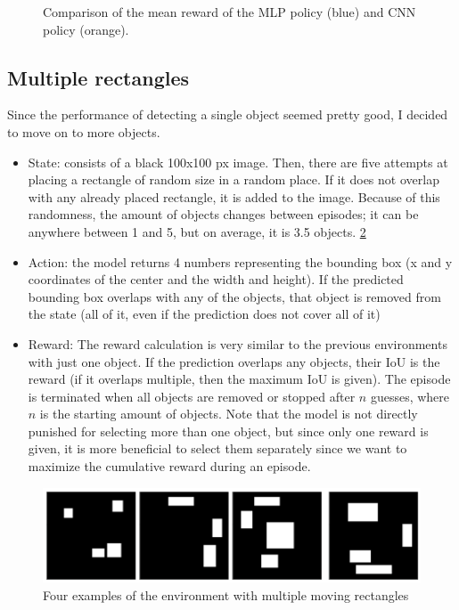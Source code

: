 \documentclass[
  digital,     %
  oneside,     %
  nosansbold,  %
  nocolorbold, %
  lof,         %
  lot,         %
]{fithesis4}
\begin{document}
\begin{figure}
    \centering
    \makebox[\textwidth][c]{}
    \caption{Comparison of the mean reward of the MLP policy (blue) and CNN policy (orange).}
    \label{fig:v2_mlp_cnn}
\end{figure}

\subsection{Multiple rectangles}
\label{subsec:multi-rect}
Since the performance of detecting a single object seemed pretty good, I decided to move on to more objects.
\begin{itemize}
    \item State: consists of a black 100x100 px image. Then, there are five attempts at placing a rectangle of random size in a random place. If it does not overlap with any already placed rectangle, it is added to the image. Because of this randomness, the amount of objects changes between episodes; it can be anywhere between 1 and 5, but on average, it is 3.5 objects. \ref{fig:env3}
    \item Action: the model returns 4 numbers representing the bounding box (x and y coordinates of the center and the width and height). If the predicted bounding box overlaps with any of the objects, that object is removed from the state (all of it, even if the prediction does not cover all of it)
    \item Reward: The reward calculation is very similar to the previous environments with just one object. If the prediction overlaps any objects, their IoU is the reward (if it overlaps multiple, then the maximum IoU is given). The episode is terminated when all objects are removed or stopped after $n$ guesses, where $n$ is the starting amount of objects. Note that the model is not directly punished for selecting more than one object, but since only one reward is given, it is more beneficial to select them separately since we want to maximize the cumulative reward during an episode.
\end{itemize}

\begin{figure}
    \includegraphics[width=1\linewidth]{env_examples/env3.png}
    \caption{Four examples of the environment with multiple moving rectangles}
    \label{fig:env3}
\end{figure}
\end{document}
